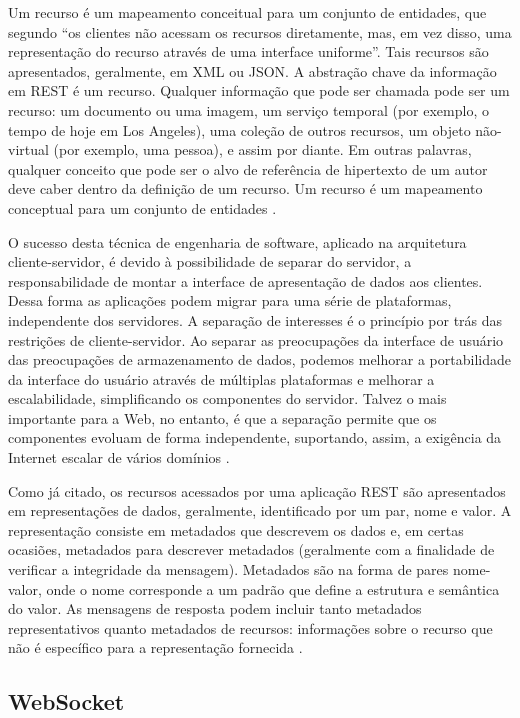 Um recurso é um mapeamento conceitual para um conjunto de entidades,
que segundo \cite{ibm:rest} “os clientes não acessam os recursos
diretamente, mas, em vez disso, uma representação do recurso através
de uma interface uniforme”. Tais recursos são apresentados, geralmente,
em XML ou JSON. A abstração chave da informação em REST é um recurso.
Qualquer informação que pode ser chamada pode ser um recurso: um documento
ou uma imagem, um serviço temporal (por exemplo, \textquotedbl{}o
tempo de hoje em Los Angeles\textquotedbl{}), uma coleção de outros
recursos, um objeto não-virtual (por exemplo, uma pessoa), e assim
por diante. Em outras palavras, qualquer conceito que pode ser o alvo
de referência de hipertexto de um autor deve caber dentro da definição
de um recurso. Um recurso é um mapeamento conceptual para um conjunto
de entidades \cite{fielding2000architectural}.

O sucesso desta técnica de engenharia de software, aplicado na arquitetura
cliente-servidor, é devido à possibilidade de separar do servidor,
a responsabilidade de montar a interface de apresentação de dados
aos clientes. Dessa forma as aplicações podem migrar para uma série
de plataformas, independente dos servidores. A separação de interesses
é o princípio por trás das restrições de cliente-servidor. Ao separar
as preocupações da interface de usuário das preocupações de armazenamento
de dados, podemos melhorar a portabilidade da interface do usuário
através de múltiplas plataformas e melhorar a escalabilidade, simplificando
os componentes do servidor. Talvez o mais importante para a Web, no
entanto, é que a separação permite que os componentes evoluam de forma
independente, suportando, assim, a exigência da Internet escalar de
vários domínios \cite{fielding2000architectural}.

Como já citado, os recursos acessados por uma aplicação REST são apresentados
em representações de dados, geralmente, identificado por um par, nome
e valor. A representação consiste em metadados que descrevem os dados
e, em certas ocasiões, metadados para descrever metadados (geralmente
com a finalidade de verificar a integridade da mensagem). Metadados
são na forma de pares nome-valor, onde o nome corresponde a um padrão
que define a estrutura e semântica do valor. As mensagens de resposta
podem incluir tanto metadados representativos quanto metadados de
recursos: informações sobre o recurso que não é específico para a
representação fornecida \cite{fielding2000architectural}.


\subsection{WebSocket}

